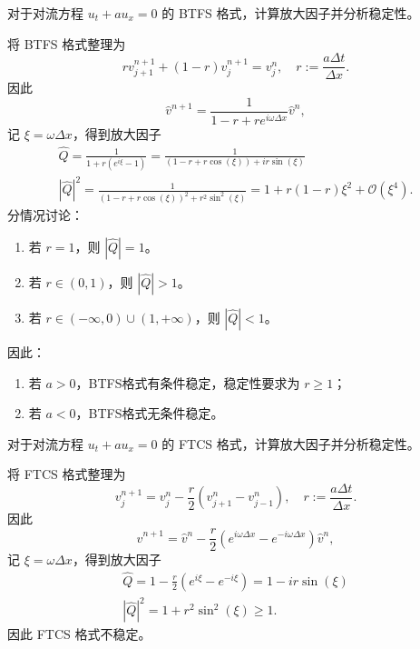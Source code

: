 \begin{example}\label{eg:btfs}
    对于对流方程 $u_t + a u_x = 0$ 的 BTFS 格式，计算放大因子并分析稳定性。
\end{example}

\begin{solution*}
    将 BTFS 格式整理为
    \[
        r v_{j+1}^{n+1} + (1-r) v_j^{n+1} = v_j^n, \quad r := \frac{a \Delta t}{\Delta x}.
    \]
    因此
    \[
        \hat{v}^{n+1} = \frac{1}{1-r+r e^{i \omega \Delta x}}\hat{v}^n,
    \]
    记 $\xi = \omega \Delta x$，得到放大因子
    \begin{gather*}
        \widehat{Q} ={}  \frac{1}{1 + r (e^{i \xi} - 1)} = \frac{1}{(1 - r + r \cos(\xi)) + i r \sin(\xi)}     \\
        |\widehat{Q}|^2 ={} \frac{1}{(1 - r + r \cos(\xi))^2 + r^2 \sin^2(\xi)} = 1 + r(1-r) \xi^2 + \mathcal{O}(\xi^4).
    \end{gather*}
    分情况讨论：
    \begin{enumerate}
        \item 若 $r=1$，则 $|\widehat{Q}| = 1$。
        \item 若 $r \in (0,1)$，则 $|\widehat{Q}| > 1$。
        \item 若 $r \in (-\infty,0) \cup (1,+\infty)$，则 $|\widehat{Q}| < 1$。
    \end{enumerate}
    因此：
    \begin{enumerate}
        \item 若 $a>0$，BTFS格式有条件稳定，稳定性要求为 $r \ge 1$；
        \item 若 $a<0$，BTFS格式无条件稳定。
    \end{enumerate}
\end{solution*}

\begin{example}\label{eg:ftcs}
    对于对流方程 $u_t + a u_x = 0$ 的 FTCS 格式，计算放大因子并分析稳定性。
\end{example}

\begin{solution*}
    将 FTCS 格式整理为
    \[
        v_j^{n+1} = v_j^n - \frac{r}2 \left( v_{j+1}^n - v_{j-1}^n \right), \quad r := \frac{a \Delta t}{\Delta x}.
    \]
    因此
    \[
        \hat{v}^{n+1} = \hat{v}^n - \frac{r}2 (e^{i \omega \Delta x} - e^{-i \omega \Delta x}) \hat{v}^n,
    \]
    记 $\xi = \omega \Delta x$，得到放大因子
    \begin{gather*}
        \widehat{Q} ={}  1 - \frac{r}2 (e^{i \xi} - e^{-i \xi}) = 1 -  i r \sin(\xi)            \\
        |\widehat{Q}|^2 ={} 1 + r^2 \sin^2(\xi) \ge 1.
    \end{gather*}
    因此 FTCS 格式不稳定。
\end{solution*}

